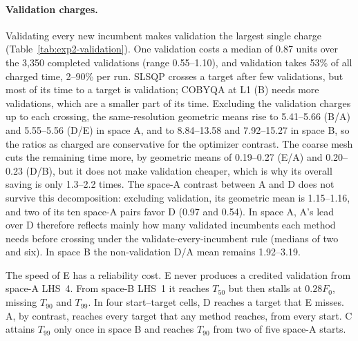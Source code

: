 \paragraph{Validation charges.}
Validating every new incumbent makes validation the largest single
charge (Table~\ref{tab:exp2-validation}). One validation costs a median of
0.87 units over the 3,350 completed validations (range 0.55--1.10), and
validation takes 53\% of all charged time, 2--90\% per run. SLSQP crosses
a target after few validations, but most of its time to a target is
validation; COBYQA at L1 (B) needs more validations, which are a smaller
part of its time. Excluding the validation charges up to each crossing, the
same-resolution geometric means rise to 5.41--5.66 (B/A) and 5.55--5.56
(D/E) in space A, and to 8.84--13.58 and 7.92--15.27 in space B, so the
ratios as charged are conservative for the optimizer contrast. The coarse
mesh cuts the remaining time more, by geometric means of 0.19--0.27 (E/A)
and 0.20--0.23 (D/B), but it does not make validation cheaper, which is why
its overall saving is only 1.3--2.2 times. The space-A contrast between A
and D does not survive this decomposition: excluding validation, its
geometric mean is 1.15--1.16, and two of its ten space-A pairs favor D
(0.97 and 0.54). In space A, A's lead over D therefore reflects mainly how
many validated incumbents each method needs before crossing under the
validate-every-incumbent rule (medians of two and six). In space B the
non-validation D/A mean remains 1.92--3.19.

\begin{table}[tbp]\centering\small
\caption{Validation charges, repeat~1. ``To crossing'' counts the
validations up to and including the first attaining one, and ``share''
gives the fraction of the time to that target charged to validation, as
medians (ranges) over the method's attained targets and starts. ``Run''
gives the range over starts of the fraction of the whole run's charged time
spent in validation.}
\label{tab:exp2-validation}
\end{table}

The speed of E has a reliability cost. E never produces a credited
validation from space-A LHS~4. From space-B LHS~1 it reaches $T_{50}$ but
then stalls at $0.28F_0$, missing $T_{90}$ and $T_{99}$. In four
start--target cells, D reaches a target that E misses. A, by contrast,
reaches every target that any method reaches, from every start. C attains
$T_{99}$ only once in space B and reaches $T_{90}$ from two of five
space-A starts.

